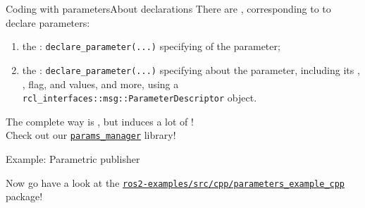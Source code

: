 \begin{frame}{Coding with parameters}{About declarations}
  There are , corresponding to  to declare parameters:
  \begin{enumerate}
    \item the : \texttt{declare\_parameter(...)} specifying  of the parameter;
    \item the : \texttt{declare\_parameter(...)} specifying  about the parameter, including its , ,  flag,  and  values,  and more, using a \texttt{rcl\_interfaces::msg::ParameterDescriptor} object.
  \end{enumerate}
  \begin{alertblock}{}
    \centering
    The complete way is , but induces a lot of !\\
    Check out our \href{https://github.com/IntelligentSystemsLabUTV/dua-utils/tree/master/src/params_manager}{\color{blue}\underline{\texttt{params\_manager}}} library!
  \end{alertblock}
\end{frame}

\begin{frame}{Example: Parametric publisher}
  \begin{block}{}
    \centering
    Now go have a look at the \href{https://github.com/IntelligentSystemsLabUTV/ros2-examples/tree/humble/src/cpp/parameters_example_cpp}{\color{blue}\underline{\texttt{ros2-examples/src/cpp/parameters\_example\_cpp}}} package!
  \end{block}
\end{frame}
